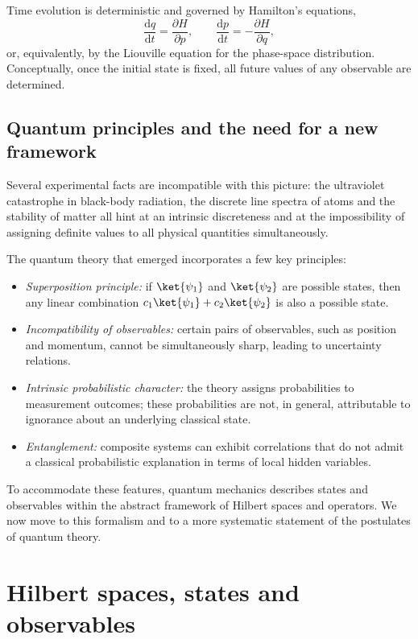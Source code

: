 Time evolution is deterministic and governed by Hamilton's equations,
\begin{equation}
	\frac{\mathrm{d}q}{\mathrm{d}t} = \frac{\partial H}{\partial p},
	\qquad
	\frac{\mathrm{d}p}{\mathrm{d}t} = -\frac{\partial H}{\partial q},
\end{equation}
or, equivalently, by the Liouville equation for the phase-space distribution. 
Conceptually, once the initial state is fixed, all future values of any observable are determined.

\subsection{Quantum principles and the need for a new framework}

Several experimental facts are incompatible with this picture: 
the ultraviolet catastrophe in black-body radiation, 
the discrete line spectra of atoms 
and the stability of matter all hint at an intrinsic discreteness and at the impossibility of assigning definite values to all physical quantities simultaneously.

The quantum theory that emerged incorporates a few key principles:
\begin{itemize}
	\item \emph{Superposition principle:} if $\ket{\psi_1}$ and $\ket{\psi_2}$ are possible states, then any linear combination $c_1\ket{\psi_1} + c_2\ket{\psi_2}$ is also a possible state.
	\item \emph{Incompatibility of observables:} certain pairs of observables, such as position and momentum, cannot be simultaneously sharp, leading to uncertainty relations.
	\item \emph{Intrinsic probabilistic character:} the theory assigns probabilities to measurement outcomes; these probabilities are not, in general, attributable to ignorance about an underlying classical state.
	\item \emph{Entanglement:} composite systems can exhibit correlations that do not admit a classical probabilistic explanation in terms of local hidden variables.
\end{itemize}
To accommodate these features, quantum mechanics describes states and observables within the abstract framework of Hilbert spaces and operators. 
We now move to this formalism and to a more systematic statement of the postulates of quantum theory.

\section{Hilbert spaces, states and observables}

